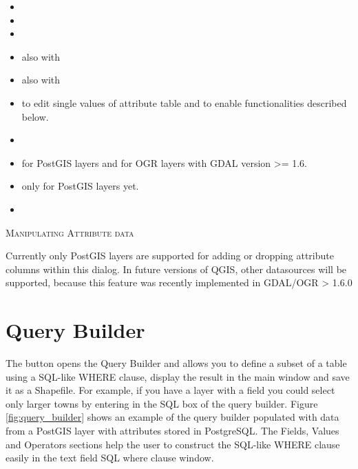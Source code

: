 \begin{itemize}
\item {}
\item {}
\item {}
\item {} also with 
\item {} also with 
\item {} to edit single values 
of attribute table and to enable functionalities described below.
\item {}
\item {} for PostGIS layers and for OGR layers with GDAL version >= 1.6.
\item {} only for PostGIS layers yet.
\item {} 
\end{itemize}

\begin{Tip}[ht]\caption{\textsc{Manipulating Attribute data}}
Currently only PostGIS layers are supported for adding or dropping
attribute columns within this dialog. In future versions of QGIS, other
datasources will be supported, because this feature was recently implemented
in GDAL/OGR > 1.6.0
\end{Tip}

\section{Query Builder}\label{sec:query_builder}

The  button opens the Query Builder and allows you to 
define a subset of a table using a SQL-like WHERE clause, display the result in the 
main window and save it as a Shapefile. For example, if you have a 
 layer 
with a  field you could select only larger towns by entering
 in the SQL box of the query builder. Figure
\ref{fig:query_builder} shows an example of the query builder populated with
data from a PostGIS layer with attributes stored in PostgreSQL. 
The Fields, Values and Operators sections help the user to construct the SQL-like
WHERE clause easily in the text field SQL where clause window.



